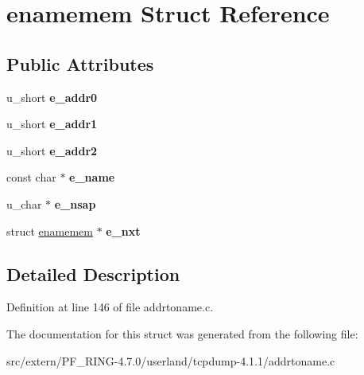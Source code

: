 \hypertarget{structenamemem}{
\section{enamemem Struct Reference}
\label{structenamemem}
}
\subsection*{Public Attributes}
\begin{DoxyCompactItemize}
\item 
\hypertarget{structenamemem_a143be10fb00d8f62c50902e2ded3be75}{
u\_\-short {\bfseries e\_\-addr0}}
\label{structenamemem_a143be10fb00d8f62c50902e2ded3be75}

\item 
\hypertarget{structenamemem_af2580a72362b0cd0382bc0f5d3b9342a}{
u\_\-short {\bfseries e\_\-addr1}}
\label{structenamemem_af2580a72362b0cd0382bc0f5d3b9342a}

\item 
\hypertarget{structenamemem_ad5a4a15308e8f89487efb001975c1c5a}{
u\_\-short {\bfseries e\_\-addr2}}
\label{structenamemem_ad5a4a15308e8f89487efb001975c1c5a}

\item 
\hypertarget{structenamemem_a096678aeabf7e5cc70423e3b90daba9b}{
const char $\ast$ {\bfseries e\_\-name}}
\label{structenamemem_a096678aeabf7e5cc70423e3b90daba9b}

\item 
\hypertarget{structenamemem_af951dc2ee682a89ecfdfd4337b51c354}{
u\_\-char $\ast$ {\bfseries e\_\-nsap}}
\label{structenamemem_af951dc2ee682a89ecfdfd4337b51c354}

\item 
\hypertarget{structenamemem_ac0883cfbfc7b6d34bf066030a032f0d3}{
struct \hyperlink{structenamemem}{enamemem} $\ast$ {\bfseries e\_\-nxt}}
\label{structenamemem_ac0883cfbfc7b6d34bf066030a032f0d3}

\end{DoxyCompactItemize}


\subsection{Detailed Description}


Definition at line 146 of file addrtoname.c.



The documentation for this struct was generated from the following file:\begin{DoxyCompactItemize}
\item 
src/extern/PF\_\-RING-\/4.7.0/userland/tcpdump-\/4.1.1/addrtoname.c\end{DoxyCompactItemize}

